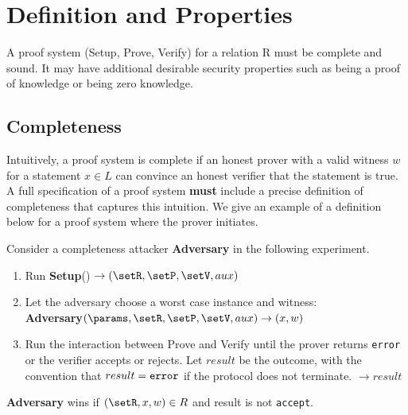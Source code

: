 \section{Definition and Properties}
\label{security:defs-props}
 
A proof system (Setup, Prove, Verify) for a relation R must be complete and sound.
It may have additional desirable security properties such as being a proof of knowledge or being zero knowledge.\loosen
 


\subsection{Completeness}
\label{sec:security:defs-props:completeness}

Intuitively, a proof system is complete if an honest prover with a valid witness $w$ for a statement $x \in L$ can convince an honest verifier that the statement is true. 
A full specification of a proof system \textbf{must} include a precise definition of completeness that captures this intuition. 
We give an example of a definition below for a proof system where the prover initiates.
 
Consider a completeness attacker \textbf{Adversary} in the following experiment.

\begin{enumerate}
    \item Run \textbf{Setup}(\params) $\rightarrow (\setR, \setP, \setV, aux)$
    \item Let the adversary choose a worst case instance and witness:\\
					\textbf{Adversary}$(\params, \setR, \setP, \setV, aux) \rightarrow (x,w)$
    \item Run the interaction between Prove and Verify until the prover returns {\tt error} or the verifier accepts or rejects. 
		Let $result$ be the outcome, with the convention that $result = \tt error$ if the protocol does not terminate.
		 $\rightarrow result$
\end{enumerate}


\begin{bulletize}
    \item \textbf{Adversary} wins if $(\setR, x, w) \in R$ and result is not {\tt accept}.
\end{bulletize}
 

